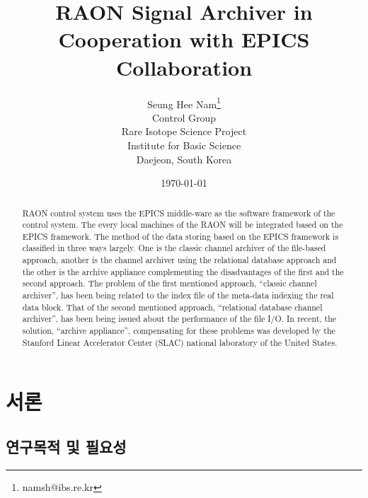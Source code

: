 \documentclass[11pt
  , a4paper
  , article
  , oneside
]{memoir}
\begin{document}
\newcommand{\technumber}{
  RAON Control-Document Series\\
  Revision : v0.1,   Release : a fixed date}
\title{\textbf{\textbf{RAON Signal Archiver in Cooperation with EPICS Collaboration}}}


\author{Seung Hee Nam\thanks{namsh@ibs.re.kr} \\
  Control Group \\
  Rare Isotope Science Project\\
  Institute for Basic Science\\
  Daejeon, South Korea
}

\date{\today}

\renewcommand{\maketitlehooka}{\begin{flushright}\textsf{\technumber}\end{flushright}}

\maketitle

\begin{abstract}
RAON control system uses the EPICS middle-ware as the software framework of the control system. The every local machines of the RAON will be integrated based on the EPICS framework. The method of the data storing based on the EPICS framework is classified in three ways largely. One is the classic channel archiver of the file-based approach, another is the channel archiver using the relational database approach and the other is the archive appliance complementing the disadvantages of the first and the second approach. The problem of the first mentioned approach, “classic channel archiver”, has been being related to the 
index file of the meta-data indexing the real data block. That of the second mentioned approach, “relational database channel archiver”, has been being issued about the performance of the file I/O. In recent, the solution, “archive appliance”, compensating for these problems was developed by the Stanford Linear Accelerator Center (SLAC) national laboratory of the United States. 
\end{abstract}

\chapter{서론}
\section{연구목적 및 필요성}
\end{document}
